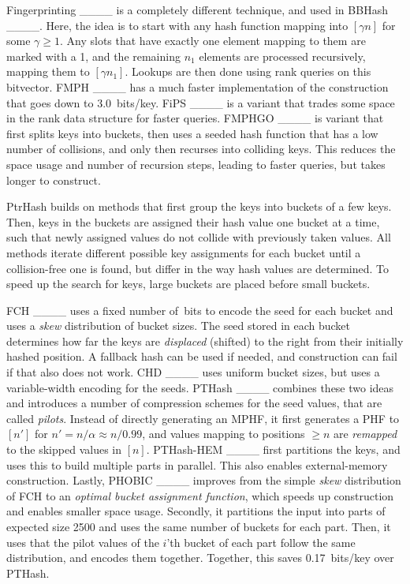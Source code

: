 Fingerprinting ____ is a completely different
technique, and used in BBHash ____. Here, the
idea is to start with any hash function mapping into \([\gamma n]\) for some
\(\gamma \geq 1\). Any slots that have exactly one element mapping to them are
marked with a 1, and the remaining \(n_1\) elements are processed recursively,
mapping them to \([\gamma n_1]\). Lookups are then done using rank queries on this
bitvector. FMPH ____ has a much faster implementation of the construction that goes
down to 3.0~bits/key. FiPS ____ is a variant that trades some
space in the rank data structure for faster queries. FMPHGO ____ is
variant that first splits keys into buckets, then uses a seeded hash function
that has a low number of collisions, and only then recurses into colliding keys.
This reduces the space usage and number of recursion steps, leading to faster
queries, but takes longer to construct.

PtrHash builds on methods that first group the keys into
buckets of a few keys. Then, keys in the buckets are assigned their hash value
one bucket at a time, such that newly assigned values do not collide with
previously taken values. All methods iterate different possible key assignments
for each bucket until a collision-free one is found, but differ in the way
hash values are determined. To speed up the search for keys, large buckets are
placed before small buckets.

FCH ____ uses a fixed number of~bits to encode the seed for each bucket and
uses a \emph{skew} distribution of bucket sizes. The seed stored in each bucket
determines how far the keys are \emph{displaced} (shifted) to the right from their
initially hashed position. A fallback hash can be used if needed, and
construction can fail if that also does not work. CHD ____ uses uniform
bucket sizes, but uses a variable-width encoding for the seeds.
PTHash ____ combines these two ideas and introduces a number of
compression schemes for the seed values, that are called \emph{pilots}. Instead of
directly generating an MPHF, it first generates a PHF to \([n']\) for
\(n'=n/\alpha \approx n/0.99\), and values mapping to positions \(\geq n\) are \emph{remapped} to
the skipped values in \([n]\). PTHash-HEM ____ first partitions the keys, and uses this
to build multiple parts in parallel. This also enables external-memory construction.
Lastly, PHOBIC ____ improves from the simple \emph{skew} distribution of
FCH to an \emph{optimal bucket assignment function}, which speeds up construction and
enables smaller space usage. Secondly, it partitions the input into parts of
expected size
2500 and uses the same number of buckets for each part. Then, it uses that the
pilot values of the \(i\)'th bucket of each part follow the same distribution, and
encodes them together. Together, this saves 0.17~bits/key over PTHash.